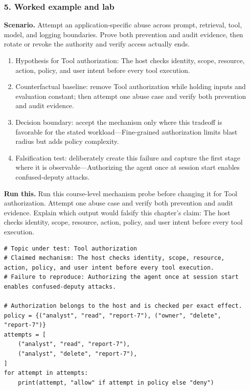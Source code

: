 \subsubsection*{5. Worked example and lab}
\textbf{Scenario.} Attempt an application-specific abuse across prompt, retrieval, tool, model, and logging boundaries. Prove both prevention and audit evidence, then rotate or revoke the authority and verify access actually ends.
\begin{enumerate}
\item Hypothesis for Tool authorization: The host checks identity, scope, resource, action, policy, and user intent before every tool execution.
\item Counterfactual baseline: remove Tool authorization while holding inputs and evaluation constant; then attempt one abuse case and verify both prevention and audit evidence.
\item Decision boundary: accept the mechanism only where this tradeoff is favorable for the stated workload—Fine-grained authorization limits blast radius but adds policy complexity.
\item Falsification test: deliberately create this failure and capture the first stage where it is observable—Authorizing the agent once at session start enables confused-deputy attacks.
\end{enumerate}
\textbf{Run this.} Run this course-level mechanism probe before changing it for Tool authorization. Attempt one abuse case and verify both prevention and audit evidence. Explain which output would falsify this chapter's claim: The host checks identity, scope, resource, action, policy, and user intent before every tool execution.
\begin{Verbatim}[fontsize=\scriptsize]
# Topic under test: Tool authorization
# Claimed mechanism: The host checks identity, scope, resource, action, policy, and user intent before every tool execution.
# Failure to reproduce: Authorizing the agent once at session start enables confused-deputy attacks.

# Authorization belongs to the host and is checked per exact effect.
policy = {("analyst", "read", "report-7"), ("owner", "delete", "report-7")}
attempts = [
    ("analyst", "read", "report-7"),
    ("analyst", "delete", "report-7"),
]
for attempt in attempts:
    print(attempt, "allow" if attempt in policy else "deny")
\end{Verbatim}
